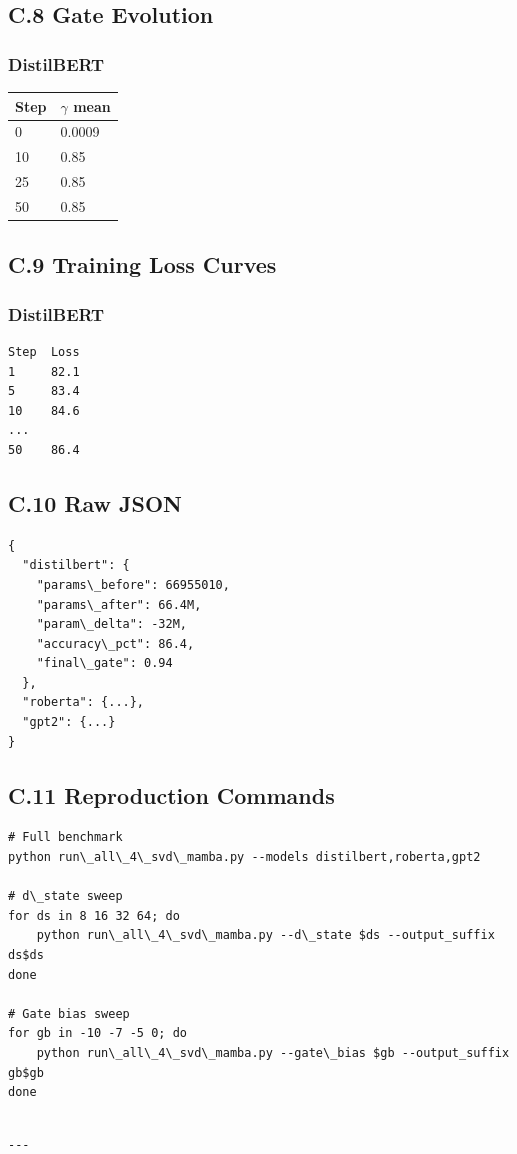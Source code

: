 \subsection{C.8 Gate Evolution}

\subsubsection{DistilBERT}

\begin{table}[H]
\centering
\small
\begin{tabular}{ll}
\toprule
\textbf{Step} & \textbf{$\gamma$ mean} \\
\midrule
0 & 0.0009 \\
10 & 0.85 \\
25 & 0.85 \\
50 & 0.85 \\
\bottomrule
\end{tabular}
\end{table}

\subsection{C.9 Training Loss Curves}

\subsubsection{DistilBERT}
\begin{lstlisting}
Step  Loss
1     82.1
5     83.4
10    84.6
...
50    86.4
\end{lstlisting}

\subsection{C.10 Raw JSON}

\begin{lstlisting}
{
  "distilbert": {
    "params\_before": 66955010,
    "params\_after": 66.4M,
    "param\_delta": -32M,
    "accuracy\_pct": 86.4,
    "final\_gate": 0.94
  },
  "roberta": {...},
  "gpt2": {...}
}
\end{lstlisting}

\subsection{C.11 Reproduction Commands}

\begin{lstlisting}
# Full benchmark
python run\_all\_4\_svd\_mamba.py --models distilbert,roberta,gpt2

# d\_state sweep
for ds in 8 16 32 64; do
    python run\_all\_4\_svd\_mamba.py --d\_state $ds --output_suffix ds$ds
done

# Gate bias sweep
for gb in -10 -7 -5 0; do
    python run\_all\_4\_svd\_mamba.py --gate\_bias $gb --output_suffix gb$gb
done
\end{lstlisting}
\begin{lstlisting}

---
\end{lstlisting}

